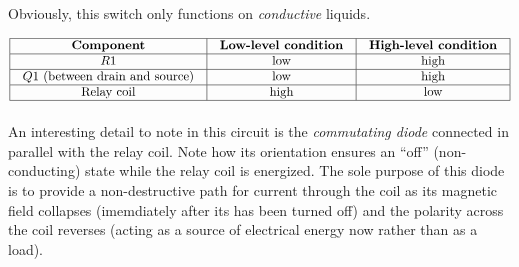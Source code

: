 Obviously, this switch only functions on {\it conductive} liquids.


$$\vbox{\offinterlineskip
\halign{\strut
\vrule \quad\hfil # \ \hfil & 
\vrule \quad\hfil # \ \hfil & 
\vrule \quad\hfil # \ \hfil \vrule \cr
\noalign{\hrule}
%
{\bf Component} & {\bf Low-level condition} & {\bf High-level condition} \cr
%
\noalign{\hrule}
%
$R1$ & low & high \cr
%
\noalign{\hrule}
%
$Q1$ (between drain and source) & low & high \cr
%
\noalign{\hrule}
%
Relay coil & high & low \cr
%
\noalign{\hrule}
} %
}$$ %

\vskip 10pt

An interesting detail to note in this circuit is the {\it commutating diode} connected in parallel with the relay coil.  Note how its orientation ensures an ``off'' (non-conducting) state while the relay coil is energized.  The sole purpose of this diode is to provide a non-destructive path for current through the coil as its magnetic field collapses (imemdiately after its has been turned off) and the polarity across the coil reverses (acting as a source of electrical energy now rather than as a load).




